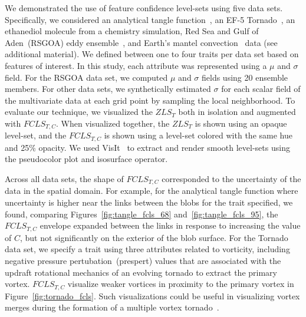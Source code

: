 %


%
%
We demonstrated the use of feature confidence level-sets using five data sets.
%
Specifically, we considered an analytical tangle function~\cite{knoll2009fast}, an EF-5 Tornado~\cite{atmos10100578}, an ethanediol molecule from a chemistry simulation, Red Sea and Gulf of Aden~(RSGOA) eddy ensemble~\cite{sanikommu2020impact}, and Earth's mantel convection~\cite{shahnas2017mid} data (see additional material).
%
We defined between one to four traits per data set based on features of interest. 
%
%
In this study, each attribute was represented using a ${\mu}$ and ${\sigma}$ field. 
%
For the RSGOA data set, we computed ${\mu}$ and ${\sigma}$ fields using 20 ensemble members. 
%
For other data sets, we synthetically estimated ${\sigma}$ for each scalar field of the multivariate data at each grid point by sampling the local neighborhood.
%
To evaluate our technique, we visualized the $ZLS_{T}$ both in isolation and augmented with $FCLS_{T,C}$. 
%
When visualized together, the $ZLS_{T}$ is shown using an opaque level-set, and the $FCLS_{T,C}$ is shown using a level-set colored with the same hue and 25\% opacity.
%
We used VisIt~\cite{childs2012visit} to extract and render smooth level-sets using the pseudocolor plot and isosurface operator.

%

%
%
Across all data sets, the shape of $FCLS_{T,C}$ corresponded to the uncertainty of the data in the spatial domain.
%
For example, for the analytical tangle function where uncertainty is higher near the links between the blobs for the trait specified, we found, comparing Figures~\ref{fig:tangle_fcls_68} and~\ref{fig:tangle_fcls_95}, the $FCLS_{T,C}$ envelope expanded between the links in response to increasing the value of $C$, but not significantly on the exterior of the blob surface.
%
For the Tornado data set, we specify a trait using three attributes related to vorticity, including negative pressure pertubation~(prespert) values that are associated with the updraft rotational mechanics of an evolving tornado to extract the primary vortex. 
%
$FCLS_{T,C}$ visualize weaker vortices in proximity to the primary vortex in Figure~\ref{fig:tornado_fcls}.
%
Such visualizations could be useful in visualizing vortex merges during the formation of a multiple vortex tornado~\cite{atmos10100578}. 
%

